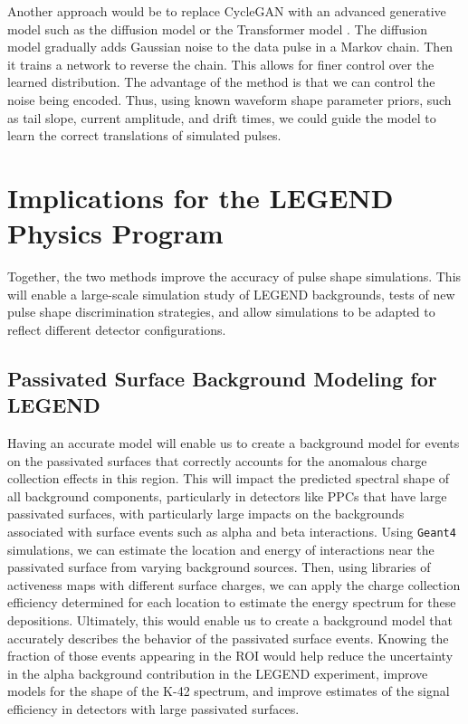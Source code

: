 Another approach would be to replace CycleGAN with an advanced generative model such as the diffusion model \cite{2020arXiv200611239H} or the Transformer model \cite{Transformer}. The diffusion model gradually adds Gaussian noise to the data pulse in a Markov chain. Then it trains a network to reverse the chain. This allows for finer control over the learned distribution. The advantage of the method is that we can control the noise being encoded. Thus, using known waveform shape parameter priors, such as tail slope, current amplitude, and drift times, we could guide the model to learn the correct translations of simulated pulses.

\section{Implications for the LEGEND Physics Program}
Together, the two methods improve the accuracy of pulse shape simulations. This will enable a large-scale simulation study of LEGEND backgrounds, tests of new pulse shape discrimination strategies, and allow simulations to be adapted to reflect different detector configurations.  

\subsection{Passivated Surface Background Modeling for LEGEND}
Having an accurate model will enable us to create a background model for events on the passivated surfaces that correctly accounts for the anomalous charge collection effects in this region. This will impact the predicted spectral shape of all background components, particularly in detectors like PPCs that have large passivated surfaces, with particularly large impacts on the backgrounds associated with surface events such as alpha and beta interactions. Using \texttt{Geant4} simulations, we can estimate the location and energy of interactions near the passivated surface from varying background sources. Then, using libraries of {\ehd} activeness maps with different surface charges, we can apply the charge collection efficiency determined for each location to estimate the energy spectrum for these depositions. Ultimately, this would enable us to create a background model that accurately describes the behavior of the passivated surface events. Knowing the fraction of those events appearing in the {\onbb} ROI would help reduce the uncertainty in the alpha background contribution in the LEGEND experiment, improve models for the shape of the K-42 spectrum, and improve estimates of the signal efficiency in detectors with large passivated surfaces.

